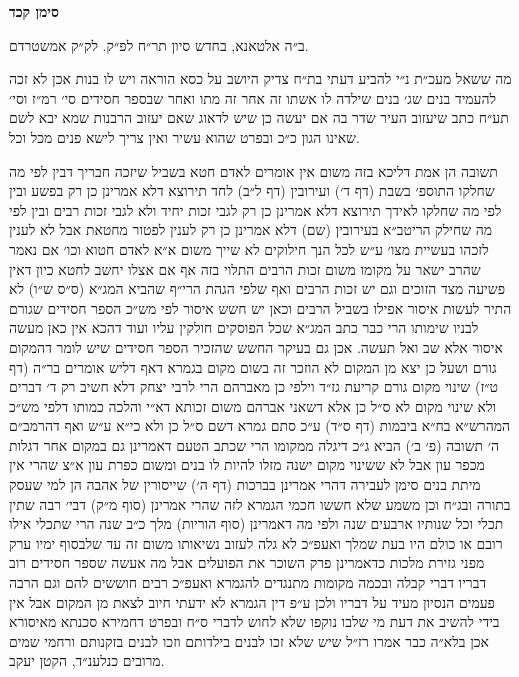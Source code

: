 \documentclass[12pt, openany]{book}
\newcommand{\chapname}{}
\newcommand{\newchap}[1]{
	\addcontentsline{toc}{chapter}{#1}
	\renewcommand{\chapname}{#1}
		\begin{center}
			\textbf{%
\fontsize{16pt}{16pt}\selectfont
				#1}
		\end{center}
}
\begin{document}
\newchap{סימן קכד}
\begin{multicols}{2}
ב״ה אלטאנא, בחדש סיון תר״ח לפ״ק. לק״ק אמשטרדם.\\\vspace{0pt}

מה ששאל מעכ״ת נ״י להביע דעתי בת״ח צדיק היושב על כסא הוראה ויש לו בנות אכן לא זכה להעמיד בנים שג׳ בנים שילדה לו אשתו זה אחר זה מתו ואחר שבספר חסידים סי׳ רמ״ז וסי׳ תע״ח כתב שיעזוב העיר שדר בה אם יעשה כן שיש לדאוג שאם יעזוב הרבנות שמא יבא לשם שאינו הגון כ״כ ובפרט שהוא עשיר ואין צריך לישא פנים מכל וכל.\\\vspace{0pt}

תשובה הן אמת דליכא בזה משום אין אומרים לאדם חטא בשביל שיזכה חבריך דבין לפי מה שחלקו התוספ׳ בשבת (דף ד׳) ועירובין (דף ל״ב) לחד תירוצא דלא אמרינן כן רק בפשע ובין לפי מה שחלקו לאידך תירוצא דלא אמרינן כן רק לגבי זכות יחיד ולא לגבי זכות רבים ובין לפי מה שחילק הריטב״א בעירובין (שם) דלא אמרינן כן רק לענין לפטור מחטאת אבל לא לענין לזכהו בעשיית מצו׳ ע״ש לכל הנך חילוקים לא שייך משום א״א לאדם חטוא וכו׳ אם נאמר שהרב ישאר על מקומו משום זכות הרבים התלוי בזה אף אם אצלו יחשב לחטא כיון דאין פשיעה מצד הזוכים וגם יש זכות הרבים ואף שלפי הגהת הרי״ף שהביא המג״א (ס״ס ש״ו) לא התיר לעשות איסור אפילו בשביל הרבים וכאן יש חשש איסור לפי מש״כ הספר חסידים שגורם לבניו שימותו הרי כבר כתב המג״א שכל הפוסקים חולקין עליו ועוד דהכא אין כאן מעשה איסור אלא שב ואל תעשה. אכן גם בעיקר החשש שהזכיר הספר חסידים שיש לומר דהמקום גורם ושעל כן יצא מן המקום לא הוזכר זה בשום מקום בגמרא דאף דליש אומרים בר״ה (דף ט״ז) שינוי מקום גורם קריעת גז״ד וילפי כן מאברהם הרי לרבי יצחק דלא חשיב רק ד׳ דברים ולא שינוי מקום לא ס״ל כן אלא דשאני אברהם משום זכותא דא״י והלכה כמותו דלפי מש״כ המהרש״א בח״א ביבמות (דף ס״ד) ע״כ סתם גמרא דשם ס״ל כן ולא כי״א ע״ש ואף דהרמב״ם ה׳ תשובה (פ׳ ב׳) הביא ג״כ דיגלה ממקומו הרי שכתב הטעם דאמרינן גם במקום אחר דגלות מכפר עון אבל לא ששינוי מקום ישנה מזלו להיות לו בנים ומשום כפרת עון א״צ שהרי אין מיתת בנים סימן לעבירה דהרי אמרינן בברכות (דף ה׳) שייסורין של אהבה הן למי שעסק בתורה ובג״ח וכן משמע שלא חששו חכמי הגמרא לזה שהרי אמרינן (סוף מ״ק) דבי׳ רבה שתין תכלי וכל שנותיו ארבעים שנה ולפי מה דאמרינן (סוף הוריות) מלך כ״ב שנה הרי שתכלי אילו רובם או כולם היו בעת שמלך ואעפ״כ לא גלה לעזוב נשיאותו משום זה עד שלבסוף ימיו ערק מפני גזירת מלכות כדאמרינן פרק השוכר את הפועלים אבל מה אעשה שספר חסידים רוב דבריו דברי קבלה ובכמה מקומות מתנגדים להגמרא ואעפ״כ רבים חוששים להם וגם הרבה פעמים הנסיון מעיד על דבריו ולכן ע״פ דין הגמרא לא ידעתי חיוב לצאת מן המקום אבל אין בידי להשיב את דעת מי שלבו נוקפו שלא לחוש לדברי ס״ח ובפרט דחמירא סכנתא מאיסורא אכן בלא״ה כבר אמרו רז״ל שיש שלא זכו לבנים בילדותם וזכו לבנים בזקנותם ורחמי שמים מרובים כנלענ״ד, הקטן יעקב.\\\vspace{0pt}

\end{multicols}\newpage
\end{document}
